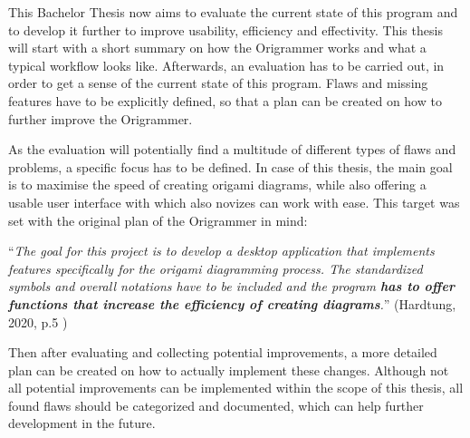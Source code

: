 This Bachelor Thesis now aims to evaluate the current state of this program and to develop it further to improve usability, efficiency and effectivity. This thesis will start with a short summary on how the Origrammer works and what a typical workflow looks like. Afterwards, an evaluation has to be carried out, in order to get a sense of the current state of this program. Flaws and missing features have to be explicitly defined, so that a plan can be created on how to further improve the Origrammer.

As the evaluation will potentially find a multitude of different types of flaws and problems, a specific focus has to be defined. In case of this thesis, the main goal is to maximise the speed of creating origami diagrams, while also offering a usable user interface with which also novizes can work with ease. This target was set with the original plan of the Origrammer in mind:

\begin{center}
\enquote{\emph{The goal for this project is to develop a desktop application that implements features specifically for the origami diagramming process. The standardized symbols and overall notations have to be included and the program \textbf{has to offer functions that increase the efficiency of creating diagrams}.}} (Hardtung, 2020, p.5 \cite{origrammer})
\end{center}

\noindent Then after evaluating and collecting potential improvements, a more detailed plan can be created on how to actually implement these changes. Although not all potential improvements can be implemented within the scope of this thesis, all found flaws should be categorized and documented, which can help further development in the future.